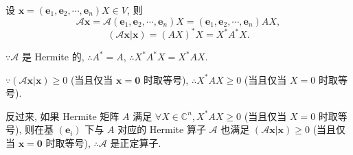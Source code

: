 \documentclass{ctexart}
\begin{document}
设 $\boldsymbol{x}=(\boldsymbol{e}_1,\boldsymbol{e}_2,\cdots,\boldsymbol{e}_n)X\in V$, 则
\[\mathcal{A}\boldsymbol{x}=\mathcal{A}(\boldsymbol{e}_1,\boldsymbol{e}_2,\cdots,\boldsymbol{e}_n)X=(\boldsymbol{e}_1,\boldsymbol{e}_2,\cdots,\boldsymbol{e}_n)AX,\]
\[(\mathcal{A}\boldsymbol{x}|\boldsymbol{x})=(AX)^*X=X^*A^*X.\]

$\because\mathcal{A}$ 是 Hermite 的, $\therefore A^*=A$, $\therefore X^*A^*X=X^*AX$.

$\because(\mathcal{A}\boldsymbol{x}|\boldsymbol{x})\geq0$ (当且仅当 $\boldsymbol{x}=\boldsymbol{0}$ 时取等号), $\therefore X^*AX\geq0$ (当且仅当 $X=0$ 时取等号).

反过来, 如果 Hermite 矩阵 $A$ 满足 $\forall X\in\mathbb{C}^n,X^*AX\geq0$ (当且仅当 $X=0$ 时取等号), 则在基 $(\boldsymbol{e}_i)$ 下与 $A$ 对应的 Hermite 算子 $\mathcal{A}$ 也满足 $(\mathcal{A}\boldsymbol{x}|\boldsymbol{x})\geq0$ (当且仅当 $\boldsymbol{x}=\boldsymbol{0}$ 时取等号), $\therefore\mathcal{A}$ 是正定算子.
\end{document}
